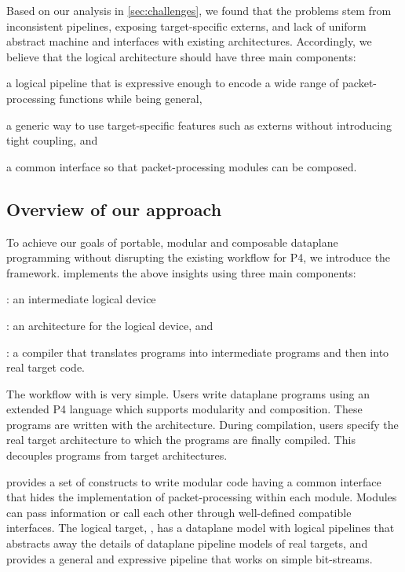 \documentclass[letterpaper,twocolumn,10pt]{article}
\begin{document}
Based on our analysis in \cref{sec:challenges}, we found that the
problems stem from inconsistent pipelines, exposing target-specific
externs, and lack of uniform abstract machine and interfaces with
existing architectures. Accordingly, we believe that the logical
architecture should have three main components:
\begin{enumerate*}[label=(\roman*)]
  \item a logical pipeline that is expressive enough to encode a
    wide range of packet-processing functions while being general,
  \item a generic way to use target-specific features such as externs
    without introducing tight coupling, and
  \item a common interface so that packet-processing modules can be
    composed.
\end{enumerate*}



\subsection{Overview of our approach}
\label{sec:overview}

To achieve our goals of portable, modular and composable dataplane
programming without disrupting the existing workflow for P4, we
introduce the \ulang framework. \ulang implements the above insights
using three main components:
\begin{enumerate*}[label=(\roman*)]
  \item \uswitch: an intermediate logical device
  \item \uarch: an architecture for the logical device, and
  \item \ucomp: a compiler that translates \ulang programs into
    intermediate \uswitch programs and then into real target code.
\end{enumerate*}

The workflow with \ulang is very simple. Users write dataplane
programs using an extended P4 language which supports modularity and
composition. These programs are written with the \uarch architecture.
During compilation, users specify the real target architecture to
which the \ulang programs are finally compiled.  This decouples
programs from target architectures.

\uarch provides a set of constructs to write modular code having a
common interface that hides the implementation of packet-processing
within each module. Modules can pass information or call each other
through well-defined compatible interfaces. The logical target,
\uswitch, has a dataplane model with logical pipelines that abstracts
away the details of dataplane pipeline models of real targets, and
provides a general and expressive pipeline that works on simple
bit-streams.
\end{document}
